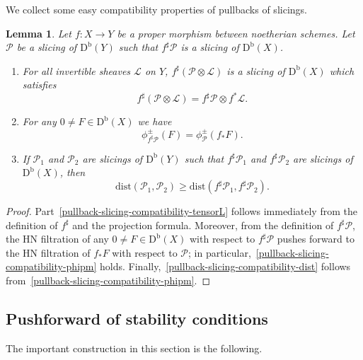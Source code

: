 \documentclass[11pt, reqno]{amsart}
\numberwithin{equation}{section}
\theoremstyle{plain}
\newtheorem{lemma}[theorem]{Lemma}
\theoremstyle{remark}
\theoremstyle{definition}
\theoremstyle{italicsname}
\newcommand{\Db}{\mathrm{D^b}}
\newcommand{\cL}{\mathcal{L}}
\newcommand{\cP}{\mathscr{P}}
\begin{document}
We collect some easy compatibility properties of pullbacks of slicings. 
\begin{lemma}
\label{lemma-pullback-slicing-compatibility}
    Let $f \colon X \to Y$ be a proper morphism between noetherian schemes. 
    Let $\cP$ be a slicing of $\Db(Y)$ such that $f^{\sharp}\cP$ is a slicing of $\Db(X)$. 
    \begin{enumerate}[{\rm (1)}]
    \item \label{pullback-slicing-compatibility-tensorL}
    For all invertible sheaves $\cL$ on $Y$, $f^{\sharp}(\cP \otimes \cL)$ is a slicing of $\Db(X)$ which satisfies 
    \[
    f^\sharp\left(\cP\otimes\cL\right)=f^\sharp\cP\otimes f^*\cL.
    \]

    \item \label{pullback-slicing-compatibility-phipm}
    For any $0 \neq F \in \Db(X)$ we have 
    \begin{equation*} 
    \phi^{\pm}_{f^{\sharp}\cP}(F) = \phi^{\pm}_{\cP}(f_*F).
    \end{equation*} 

    \item \label{pullback-slicing-compatibility-dist}
If $\cP_1$ and $\cP_2$ are slicings of $\Db(Y)$ such that $f^\sharp\cP_1$ and $f^\sharp\cP_2$ are slicings of $\Db(X)$, then
\[
\mathrm{dist}(\cP_1,\cP_2)\geq\mathrm{dist}(f^\sharp\cP_1,f^\sharp\cP_2).
\]
    \end{enumerate}
\end{lemma}

\begin{proof}
    Part~\ref{pullback-slicing-compatibility-tensorL} follows immediately from the definition of $f^{\sharp}$ and the projection formula. 
    Moreover, from the definition of $f^{\sharp}\cP$, the HN filtration of any $0 \neq F \in \Db(X)$ with respect to $f^{\sharp}\cP$ pushes forward to the HN filtration of $f_*F$ with respect to $\cP$; in particular,~\ref{pullback-slicing-compatibility-phipm} holds. 
    Finally,~\ref{pullback-slicing-compatibility-dist} follows from~\ref{pullback-slicing-compatibility-phipm}. 
\end{proof}

\subsection{Pushforward of stability conditions} 
\label{subsection-pushforward-stability}

The important construction in this section is the following.
\end{document}
